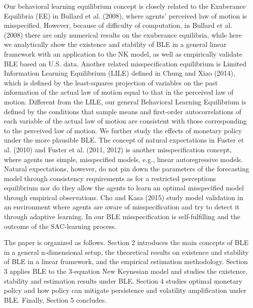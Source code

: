 Our behavioral learning equilibrium concept is closely related to the Exuberance Equilibria (EE) in Bullard et al. (2008), where agents' perceived law of motion is misspecified. However, because of difficulty of computation, in Bullard et al. (2008) there are only numerical results on the exuberance equilibria, while here we analytically show the existence and stability of BLE in a general linear framework with an application to the NK model, as well as empirically validate BLE based on U.S. data. Another related misspecification  equilibrium is Limited Information Learning Equilibrium (LILE) defined in Chung and Xiao (2014), which is defined by the least-squares projection of variables on the past information of the actual law of motion equal to that in the perceived law of motion. Different from the LILE, our general Behavioral Learning Equilibrium is defined by the conditions that sample means and first-order autocorrelations of each variable of the actual law of motion are consistent with those corresponding to the perceived law of motion. We further study the effects of monetary policy under the more plausible BLE. The concept of natural expectations in Fuster et al. (2010) and Fuster et al. (2011, 2012) is another misspecification concept, where agents use simple, misspecified models, e.g., linear autoregressive models. Natural expectations, however, do not pin down the parameters of the forecasting model through consistency requirements as for a restricted perceptions equilibrium nor do they allow the agents to learn an optimal misspecified model through empirical observations. Cho and Kasa (2015) study model validation in an environment where agents are aware of misspecification and try to detect it through adaptive learning. In our BLE misspecification is self-fulfilling and the outcome of the SAC-learning process.

The paper is organized as follows. Section 2 introduces the main concepts of BLE in a general n-dimensional setup, the theoretical results on existence and stability of BLE in a linear framework, and the empirical estimation methodology. Section 3 applies BLE to the 3-equation New Keynesian model and studies the existence, stability and estimation results under BLE. Section 4 studies optimal monetary policy and how policy can mitigate persistence and volatility amplification under BLE. Finally, Section 5 concludes.

